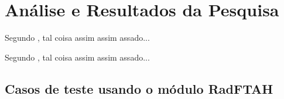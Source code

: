 \chapter{Análise e Resultados da Pesquisa}
Segundo \cite{Abate2008}, tal coisa assim assim assado...

Segundo \cite{Arora1998}, tal coisa assim assim assado...
\section{Casos de teste usando o módulo RadFTAH}
